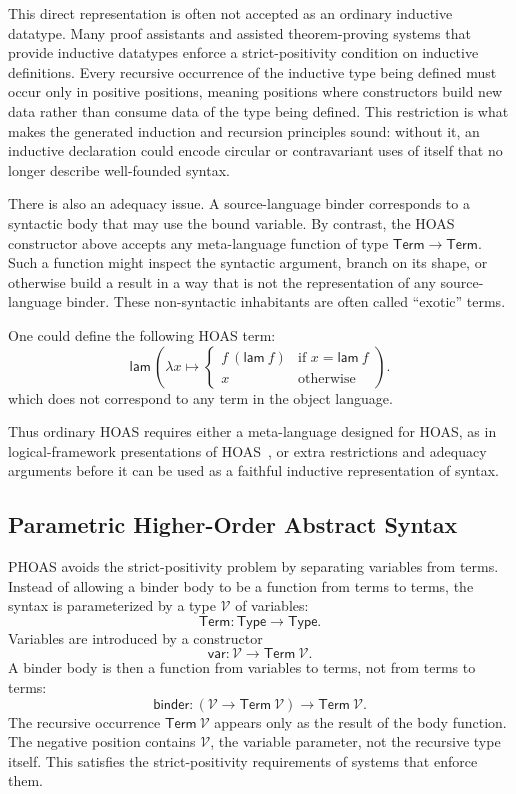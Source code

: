 This direct representation is often not accepted as an ordinary inductive datatype.
Many proof assistants and assisted theorem-proving systems that provide inductive datatypes enforce a strict-positivity condition on inductive definitions.
Every recursive occurrence of the inductive type being defined must occur only in positive positions, meaning positions where constructors build new data rather than consume data of the type being defined.
This restriction is what makes the generated induction and recursion principles sound: without it, an inductive declaration could encode circular or contravariant uses of itself that no longer describe well-founded syntax.

There is also an adequacy issue.
A source-language binder corresponds to a syntactic body that may use the bound variable.
By contrast, the HOAS constructor above accepts any meta-language function of type \(\mathsf{Term} \to \mathsf{Term}\).
Such a function might inspect the syntactic argument, branch on its shape, or otherwise build a result in a way that is not the representation of any source-language binder.
These non-syntactic inhabitants are often called ``exotic'' terms.
\begin{example}
One could define the following HOAS term:
\[
  \mathsf{lam}\,
    \left(\lambda x ↦
      \begin{cases}
        f\ (\mathsf{lam}\ f) & \text{if } x = \mathsf{lam}\ f\\
        x & \text{otherwise}
      \end{cases}
    \right).
\]
which does not correspond to any term in the object language.
\end{example}
Thus ordinary HOAS requires either a meta-language designed for HOAS, as in logical-framework presentations of HOAS~\cite{pfenning1988hoas}, or extra restrictions and adequacy arguments before it can be used as a faithful inductive representation of syntax.

\subsection{Parametric Higher-Order Abstract Syntax}

PHOAS avoids the strict-positivity problem by separating variables from terms.
Instead of allowing a binder body to be a function from terms to terms, the syntax is parameterized by a type \(\mathcal V\) of variables:
\[
  \mathsf{Term} : \mathsf{Type} \to \mathsf{Type}.
\]
Variables are introduced by a constructor
\[
  \mathsf{var} : \mathcal V \to \mathsf{Term}\ \mathcal V.
\]
A binder body is then a function from variables to terms, not from terms to terms:
\[
  \mathsf{binder} :
    (\mathcal V \to \mathsf{Term}\ \mathcal V)
    \to \mathsf{Term}\ \mathcal V.
\]
The recursive occurrence \(\mathsf{Term}\ \mathcal V\) appears only as the result of the body function.
The negative position contains \(\mathcal V\), the variable parameter, not the recursive type itself.
This satisfies the strict-positivity requirements of systems that enforce them.

